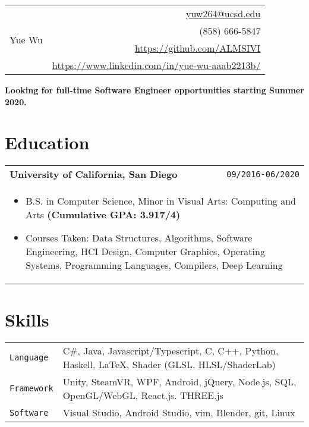 \documentclass[10pt, letterpaper]{article}
\newcommand{\itemcols}[1]{
	\multicolumn{2}{p{\dimexpr \linewidth-2\tabcolsep}}{
	\begin{itemize}
		#1
	\end{itemize}
	}
}
\begin{document}
\noindent
\begin{tabularx}{\linewidth}{X r}
	\multirow{4}{*}{{\fontsize{45}{55}\selectfont Yue Wu}}
	& \href{mailto:yuw264@ucsd.edu}{yuw264@ucsd.edu} \\
	& (858) 666-5847 \\
	& \href{https://github.com/ALMSIVI}{https://github.com/ALMSIVI} \\
	& \href{https://www.linkedin.com/in/yue-wu-aaab2213b/}{https://www.linkedin.com/in/yue-wu-aaab2213b/}
\end{tabularx}

\noindent
\textbf{Looking for full-time Software Engineer opportunities starting Summer 2020.}

\begin{comment}
\begin{tabularx}{\linewidth}{X r}
\multirow{4}{*}{{\fontsize{45}{60}\selectfont Yue Wu}} 
& \href{mailto:yuw264@ucsd.edu}{yuw264@ucsd.edu} \\
& (858) 666-5847 \\
& 8840 Costa Verde Blvd. Apt. 3322 \\
& San Diego, CA 92122
\end{tabularx}
\end{comment}


\section{Education}
\smallskip
\noindent
\begin{tabularx}{\linewidth}{X r}
	\textbf{\large University of California, San Diego} & \texttt{09/2016-06/2020} \\
	\itemcols{
		\item B.S. in Computer Science, Minor in Visual Arts: Computing and Arts \textbf{(Cumulative GPA: 3.917/4)}
		\item Courses Taken: Data Structures, Algorithms, Software Engineering, HCI Design, Computer Graphics, Operating Systems, Programming Languages, Compilers, Deep Learning
	}
\end{tabularx}


\section{Skills}
\smallskip
\noindent
\begin{tabularx}{\linewidth}{l X}
	\texttt{Language} & C\#, Java, Javascript/Typescript, C, C++, Python, Haskell, \LaTeX, Shader (GLSL, HLSL/ShaderLab) \\
	\texttt{Framework} & Unity, SteamVR, WPF, Android, jQuery, Node.js, SQL, OpenGL/WebGL, React.js. THREE.js \\
	\texttt{Software} & Visual Studio, Android Studio, vim, Blender, git, Linux
\end{tabularx}
\end{document}
